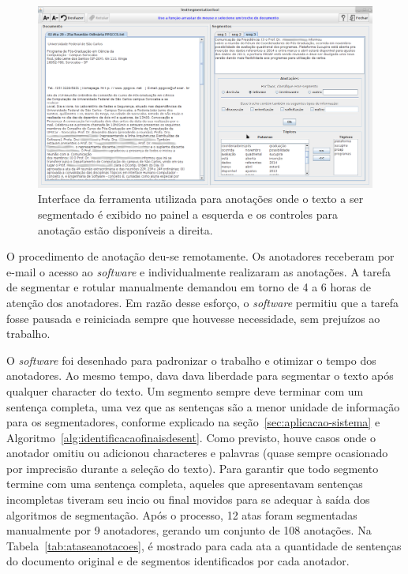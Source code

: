   \begin{figure}[!h]
	  \centering
	  \includegraphics[width=1\textwidth]{conteudo/capitulos/figs/interface-TST.png}
	  \caption{Interface da ferramenta utilizada para anotações onde o texto a ser segmentado é exibido no painel a esquerda e os controles para anotação estão disponíveis a direita.}
	  \label{fig:interfaceanotacoes}
  \end{figure}



O procedimento de anotação deu-se remotamente. Os anotadores receberam por e-mail o acesso ao \textit{software} e individualmente realizaram as anotações. A tarefa de segmentar e rotular manualmente demandou em torno de 4 a 6 horas de atenção dos anotadores. Em razão desse esforço, o \textit{software} permitiu que a tarefa fosse pausada e reiniciada sempre que houvesse necessidade, sem prejuízos ao trabalho.

O \textit{software} foi desenhado para padronizar o trabalho e otimizar o tempo dos anotadores. Ao mesmo tempo, dava dava liberdade para segmentar o texto após qualquer character do texto. Um segmento sempre deve terminar com um sentença completa, uma vez que as sentenças são a menor unidade de informação para os segmentadores, conforme explicado na seção~\ref{sec:aplicacao-sistema} e Algoritmo~\ref{alg:identificacaofinaisdesent}. Como previsto, houve casos onde o anotador omitiu ou adicionou characteres e palavras (quase sempre ocasionado por imprecisão durante a seleção do texto). Para garantir que todo segmento termine com uma sentença completa, aqueles que apresentavam sentenças incompletas tiveram seu incio ou final movidos para se adequar à saída dos algoritmos de segmentação. Após o processo, 12 atas foram segmentadas manualmente por 9 anotadores, gerando um conjunto de 108 anotações. Na Tabela~\ref{tab:ataseanotacoes}, é mostrado para cada ata a quantidade de sentenças do documento original e de segmentos identificados por cada anotador.



